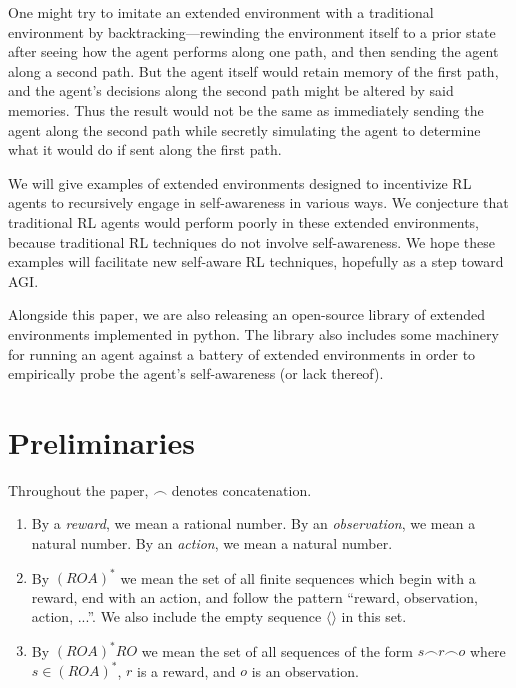 \documentclass[runningheads]{llncs}
\begin{document}
One might try to imitate an extended environment with a traditional environment by
backtracking---rewinding the environment itself to a prior state after seeing how the
agent performs along one path, and then sending the agent along a second path.
But the agent itself would retain memory of the first path, and the agent's decisions
along the second path might be altered by said memories. Thus the result would not be
the same as immediately sending the agent along the second path while secretly simulating
the agent to determine what it would do if sent along the first path.

We will give examples of
extended environments designed to incentivize RL agents to
recursively engage in self-awareness in various ways.
We conjecture that traditional RL agents would perform poorly in these extended
environments, because traditional RL techniques do not involve
self-awareness. We hope these examples will facilitate
new self-aware RL techniques, hopefully as a step toward AGI.

Alongside this paper, we are also releasing an open-source library
\cite{library} of extended environments
implemented in python. The library also includes some machinery for running an
agent against a battery of extended environments in order to empirically
probe the agent's self-awareness (or lack thereof).

\section{Preliminaries}

Throughout the paper, $\frown$ denotes concatenation.

\begin{definition}
\label{historiesdefn}
    \begin{enumerate}
        \item
        By a \emph{reward}, we mean a rational number.
        By an \emph{observation}, we mean a natural number.
        By an \emph{action}, we mean a natural number.
        \item
        By $(ROA)^*$ we mean the set of all finite sequences which begin with
        a reward, end with an action, and follow the pattern
        ``reward, observation, action, ...''. We also include
        the empty sequence $\langle\rangle$ in this set.
        \item
        By $(ROA)^*RO$ we mean the set of all sequences of the form
        $s\frown r\frown o$ where $s\in (ROA)^*$, $r$ is a reward, and
        $o$ is an observation.
    \end{enumerate}
\end{definition}
\end{document}
